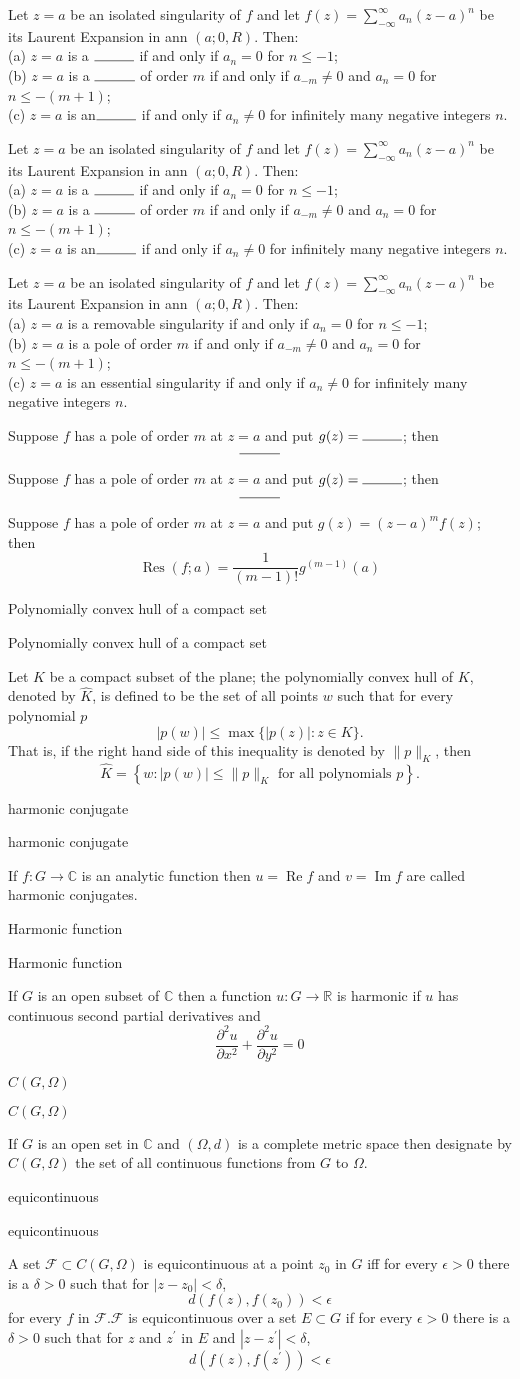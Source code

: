 \documentclass[17pt]{extarticle}
\newcommand{\boxset}[2]{\begin{mdframed}[style=darkQuesion]
#1
\end{mdframed}
\newpage
\begin{mdframed}[style=darkQuesion]
  #1
    \end{mdframed}
\begin{mdframed}[style=darkAnswer]
  #2
    \end{mdframed}
    \newpage
}
\begin{document}
\boxset{Let $z=a$ be an isolated singularity of $f$ and let $f(z)=\sum_{-\infty}^{\infty} a_{n}(z-a)^{n}$ be its Laurent Expansion in ann $(a ; 0, R)$. Then:\[\ \] (a) $z=a$ is a $\rule{1cm}{0.15mm}$ if and only if $a_{n}=0$ for $n \leq-1$;\[\ \] (b) $z=a$ is a $\rule{1cm}{0.15mm}$ of order $m$ if and only if $a_{-m} \neq 0$ and $a_{n}=0$ for $n \leq-(m+1)$;\[\ \] (c) $z=a$ is an$\rule{1cm}{0.15mm}$ if and only if $a_{n} \neq 0$ for infinitely many negative integers $n$. }
{Let $z=a$ be an isolated singularity of $f$ and let $f(z)=\sum_{-\infty}^{\infty} a_{n}(z-a)^{n}$ be its Laurent Expansion in ann $(a ; 0, R)$. Then:\[\ \] (a) $z=a$ is a removable singularity if and only if $a_{n}=0$ for $n \leq-1$;\[\ \] (b) $z=a$ is a pole of order $m$ if and only if $a_{-m} \neq 0$ and $a_{n}=0$ for $n \leq-(m+1)$;\[\ \] (c) $z=a$ is an essential singularity if and only if $a_{n} \neq 0$ for infinitely many negative integers $n$.}
\boxset{Suppose $f$ has a pole of order $m$ at $z=a$ and put $g(z)=\rule{1cm}{0.15mm}$; then \[\rule{1cm}{0.15mm}\] }
{   Suppose $f$ has a pole of order $m$ at $z=a$ and put $g(z)=(z-a)^{m} f(z)$; then \[\operatorname{Res}(f ; a)=\frac{1}{(m-1) !} g^{(m-1)}(a)\] }
\boxset{Polynomially convex hull of a compact set}
{Let $K$ be a compact subset of the plane; the polynomially convex hull of $K$, denoted by $\hat{K}$, is defined to be the set of all points $w$ such that for every polynomial $p$\[|p(w)| \leq \max \{|p(z)|: z \in K\} .\] That is, if the right hand side of this inequality is denoted by $\|p\|_{K}$, then \[\hat{K}=\left\{w:|p(w)| \leq\|p\|_{K} \text { for all polynomials } p\right\} .\]}
\boxset{harmonic conjugate}
{If $f: G \rightarrow \mathbb{C}$ is an analytic function then $u=\operatorname{Re} f$ and $v=\operatorname{Im} f$ are called harmonic conjugates.}
\boxset{Harmonic function}
{If $G$ is an open subset of $\mathbb{C}$ then a function $u: G \rightarrow \mathbb{R}$ is harmonic if $u$ has continuous second partial derivatives and\[\frac{\partial^{2} u}{\partial x^{2}}+\frac{\partial^{2} u}{\partial y^{2}}=0\]}
\boxset{$C(G, \Omega)$}
{If $G$ is an open set in $\mathbb{C}$ and $(\Omega, d)$ is a complete metric space then designate by $C(G, \Omega)$ the set of all continuous functions from $G$ to $\Omega$.}
\boxset{equicontinuous}
{A set $\mathscr{F} \subset C(G, \Omega)$ is equicontinuous at a point $z_{0}$ in $G$ iff for every $\epsilon>0$ there is a $\delta>0$ such that for $\left|z-z_{0}\right|<\delta$,\[d\left(f(z), f\left(z_{0}\right)\right)<\epsilon\]for every $f$ in $\mathscr{F} . \mathscr{F}$ is equicontinuous over a set $E \subset G$ if for every $\epsilon>0$ there is a $\delta>0$ such that for $z$ and $z^{\prime}$ in $E$ and $\left|z-z^{\prime}\right|<\delta$,\[d\left(f(z), f\left(z^{\prime}\right)\right)<\epsilon\]}
\end{document}
